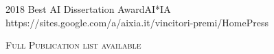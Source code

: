 \documentclass[localFont,alternative]{documentMETADATA}
\begin{document}
\begin{awards}
	\awardentry
	{2018}
	{Best AI Dissertation Award}{AI*IA} %
	{https://sites.google.com/a/aixia.it/vincitori-premi/Home}{Press}


\end{awards}	


{\textsc{Full Publication list available  }}
\end{document}

